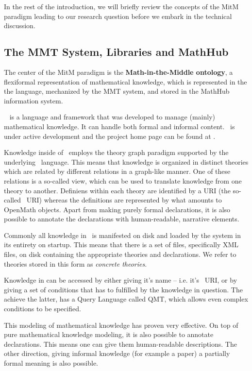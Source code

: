 In the rest of the introduction, we will briefly review the concepts of the MitM paradigm leading to our research question before we embark in the technical discussion. 

\subsection{The MMT System, Libraries and MathHub}\label{sec:intro:mmt}

The center of the MitM paradigm is the \textbf{Math-in-the-Middle ontology}, a flexiformal representation of mathematical knowledge, which is represented in the the \omdocmmt language, mechanized by the MMT system, and stored in the MathHub information system. 

\mmt\ \cite{Rabe:MMTLanguageSystem09} is a language and framework that was developed to manage (mainly) mathematical knowledge. 
It can handle both formal and informal content. 
\mmt\ is under active development and the project home page can be found at \cite{uniformal:on}. 

Knowledge inside of \mmt\ employs the theory graph paradigm supported by the underlying \omdocmmt\ language. 
This means that knowledge is organized in distinct theories which are related by different relations in a graph-like manner. 
One of these relations is a so-called view, which can be used to translate knowledge from one theory to another. 
Definiens within each theory are identified by a URI (the so-called \mmt\ URI) whereas the definitions are represented by what amounts to OpenMath \cite{BusCapCar:oms04} objects. 
Apart from making purely formal declarations, it is also possible to annotate the declarations with human-readable, narrative elements. 

Commonly all knowledge in \mmt\ is manifested on disk and loaded by the system in its entirety on startup. 
This means that there is a set of files, specifically XML files, on disk containing the appropriate theories and declarations. 
We refer to theories stored in this form as \textit{concrete theories}. 

Knowledge in \mmt can be accessed by either giving it's name -- i.e. it's \mmt\ URI, 
or by giving a set of conditions that has to fulfilled by the knowledge in question. 
The achieve the latter, \mmt has a Query Language called QMT, which allows even complex conditions to be specified. 

This modeling of mathematical knowledge has proven very effective. 
On top of pure mathematical knowledge modeling, it is also possible to annotate declarations. 
This means one can give them human-readable descriptions.
The other direction, giving informal knowledge (for example a paper) a partially formal meaning is also possible.


